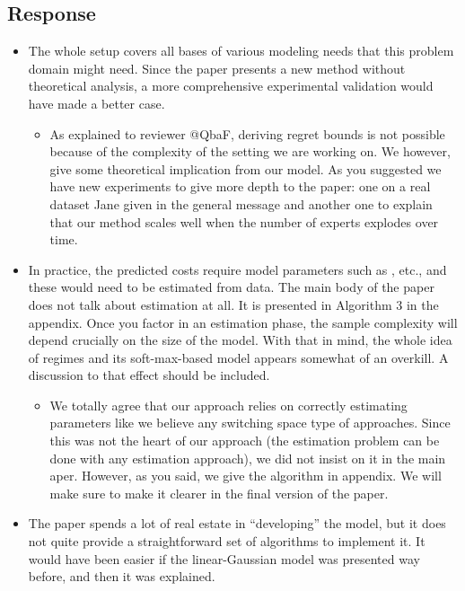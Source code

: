 \subsection{Response}
\begin{itemize}
    \item The whole setup covers all bases of various modeling needs that this problem domain might need. Since the paper presents a new method without theoretical analysis, a more comprehensive experimental validation would have made a better case.
    \begin{itemize}
        \item As explained to reviewer @QbaF, deriving regret bounds is not possible because of the complexity of
        the setting we are working on. We however, give some theoretical implication from our model. As you
        suggested we have new experiments to give more depth to the paper: one on a real dataset Jane given in the
        general message and another one to explain that our method scales well when the number of experts explodes
        over time.
    \end{itemize}
    \item In practice, the predicted costs require model parameters such as , etc., and these would need to be
    estimated from data. The main body of the paper does not talk about estimation at all. It is presented in Algorithm 3 in the appendix. Once you factor in an estimation phase, the sample complexity will depend crucially on the size of the model. With that in mind, the whole idea of regimes and its soft-max-based model appears somewhat of an overkill. A discussion to that effect should be included.
    \begin{itemize}
        \item We totally agree that our approach relies on correctly estimating parameters like we believe any
        switching space type of approaches. Since this was not the heart of our approach (the estimation problem can
        be done with any estimation approach), we did not insist on it in the main aper. However, as you said, we
        give the algorithm in appendix. We will make sure to make it clearer in the final version of the paper.
    \end{itemize}
    \item The paper spends a lot of real estate in ``developing'' the model, but it does not quite provide a straightforward set of algorithms to implement it. It would have been easier if the linear-Gaussian model was presented way before, and then it was explained.

\end{itemize}
